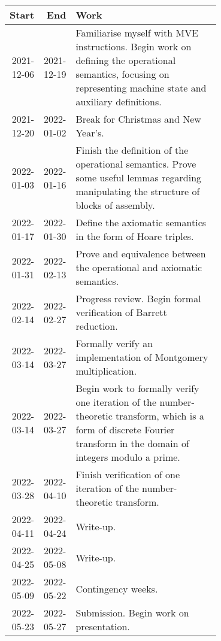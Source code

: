 \documentclass[11pt]{article}
\begin{document}
\begin{center}
\begin{tabular}{rrp{0.7\linewidth}}
Start & End & Work\\
\hline
2021-12-06 & 2021-12-19 & Familiarise myself with MVE instructions. Begin work on defining the operational semantics, focusing on representing machine state and auxiliary definitions.\\
2021-12-20 & 2022-01-02 & Break for Christmas and New Year's.\\
2022-01-03 & 2022-01-16 & Finish the definition of the operational semantics. Prove some useful lemmas regarding manipulating the structure of blocks of assembly.\\
2022-01-17 & 2022-01-30 & Define the axiomatic semantics in the form of Hoare triples.\\
2022-01-31 & 2022-02-13 & Prove and equivalence between the operational and axiomatic semantics.\\
2022-02-14 & 2022-02-27 & Progress review. Begin formal verification of Barrett reduction.\\
2022-03-14 & 2022-03-27 & Formally verify an implementation of Montgomery multiplication.\\
2022-03-14 & 2022-03-27 & Begin work to formally verify one iteration of the number-theoretic transform, which is a form of discrete Fourier transform in the domain of integers modulo a prime.\\
2022-03-28 & 2022-04-10 & Finish verification of one iteration of the number-theoretic transform.\\
2022-04-11 & 2022-04-24 & Write-up.\\
2022-04-25 & 2022-05-08 & Write-up.\\
2022-05-09 & 2022-05-22 & Contingency weeks.\\
2022-05-23 & 2022-05-27 & Submission. Begin work on presentation.\\
\end{tabular}

\end{center}

\newpage
\appendix
\printbibliography{}
\end{document}
